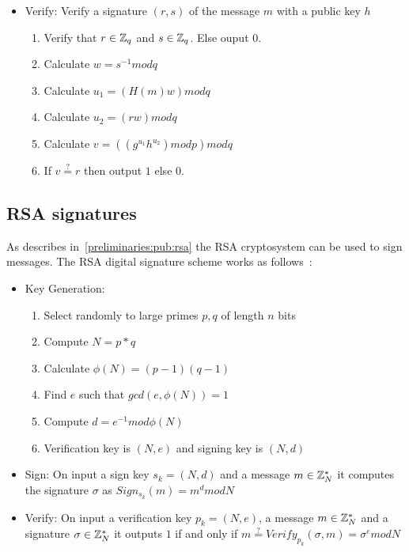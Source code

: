 \begin{itemize}
  \item Verify: Verify a signature $(r, s)$ of the message $m$ with a public key $h$
    \begin{enumerate}
      \item Verify that $r \in \mathbb{Z}_q$ and $s \in \mathbb{Z}_q$. Else ouput $0$.
      \item Calculate $w = s^{-1}modq$
      \item Calculate $u_1 = (H(m)w)modq$
      \item Calculate $u_2 = (rw)modq$
      \item Calculate $v = ((g^{u_1}h^{u_2})modp)modq$
      \item If $v \stackrel{?}{=} r$ then output $1$ else $0$.
    \end{enumerate}
\end{itemize}

\subsection{RSA signatures}
\label{preliminaries:sign:rsa}

As describes in~\ref{preliminaries:pub:rsa} the RSA cryptosystem can be used to sign messages. The RSA digital signature scheme works as follows~\cite{Katz:2014:IMC:2700550, kiagias:crypto}:

\begin{itemize}
  \item Key Generation:
    \begin{enumerate}
      \item Select randomly to large primes $p, q$ of length $n$ bits
      \item Compute $N = p*q$
      \item Calculate $\phi(N) = (p - 1)(q - 1)$
      \item Find $e$ such that $gcd(e, \phi(N)) = 1$
      \item Compute $d = e^{-1} mod\phi(N)$
      \item Verification key is $(N, e)$ and signing key is $(N, d)$
    \end{enumerate}
  \item Sign: On input a sign key $s_k = (N, d)$ and a message $m \in \mathbb{Z}^{*}_{N}$ it computes the signature $\sigma$ as $ Sign_{s_k}(m) = m^{d}modN$
  \item Verify: On input a verification key $p_k = (N, e)$, a message $m \in \mathbb{Z}^{*}_{N}$ and a signature $\sigma \in \mathbb{Z}^{*}_{N}$ it outputs $1$ if and only if $m \stackrel{?}{=} Verify_{p_k}(\sigma, m) = \sigma^{e}modN$
\end{itemize}

